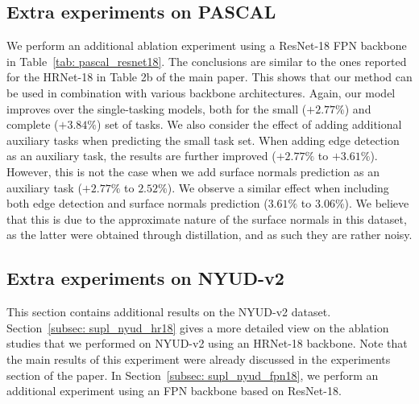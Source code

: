 \documentclass[runningheads]{llncs}
\begin{document}
\subsection{Extra experiments on PASCAL}
We perform an additional ablation experiment using a ResNet-18 FPN backbone in Table~\ref{tab: pascal_resnet18}. The conclusions are similar to the ones reported for the HRNet-18 in Table 2b of the main paper. This shows that our method can be used in combination with various backbone architectures. Again, our model improves over the single-tasking models, both for the small ($+2.77\%$) and complete ($+3.84\%$) set of tasks. We also consider the effect of adding additional auxiliary tasks when predicting the small task set. When adding edge detection as an auxiliary task, the results are further improved ($+2.77\%$ to $+3.61\%$). However, this is not the case when we add surface normals prediction as an auxiliary task ($+2.77\%$ to $2.52\%$). We observe a similar effect when including both edge detection and surface normals prediction ($3.61\%$ to $3.06\%$). We believe that this is due to the approximate nature of the surface normals in this dataset, as the latter were obtained through distillation, and as such they are rather noisy. 

\subsection{Extra experiments on NYUD-v2}
This section contains additional results on the NYUD-v2 dataset. Section~\ref{subsec: supl_nyud_hr18} gives a more detailed view on the ablation studies that we performed on NYUD-v2 using an HRNet-18 backbone. Note that the main results of this experiment were already discussed in the experiments section of the paper. In Section~\ref{subsec: supl_nyud_fpn18}, we perform an additional experiment using an FPN backbone based on ResNet-18. 
\end{document}

